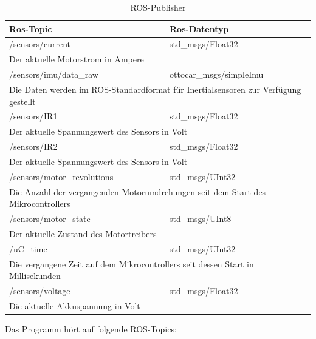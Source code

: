 \begin{table}[H]
  \centering
  \begin{tabularx}{\textwidth}{|l|l|}
    \hline
     Ros-Topic 			& Ros-Datentyp			 \\ \hline \hline	
    /sensors/current		& std\_msgs/Float32														\\ \hline
    \multicolumn{2}{|X|}{Der aktuelle Motorstrom in Ampere}											\\ \hline\hline
    /sensors/imu/data\_raw	& ottocar\_msgs/simpleImu													\\ \hline
    \multicolumn{2}{|X|}{Die Daten werden im ROS-Standardformat für Inertialsensoren zur Verfügung gestellt	}						\\ \hline\hline
    /sensors/IR1		& std\_msgs/Float32										\\ \hline
     \multicolumn{2}{|X|}{Der aktuelle Spannungswert des Sensors in Volt}										\\ \hline\hline
    /sensors/IR2		& std\_msgs/Float32										\\ \hline
      \multicolumn{2}{|X|}{Der aktuelle Spannungswert des Sensors in Volt}										\\ \hline\hline
    /sensors/motor\_revolutions	& std\_msgs/UInt32										\\ \hline
      \multicolumn{2}{|X|}{Die Anzahl der vergangenden Motorumdrehungen seit dem Start des Mikrocontrollers}						\\ \hline\hline
    /sensors/motor\_state	& std\_msgs/UInt8										\\ \hline
      \multicolumn{2}{|X|}{Der aktuelle Zustand des Motortreibers}											\\ \hline\hline
    /uC\_time			& std\_msgs/UInt32										\\ \hline
      \multicolumn{2}{|X|}{Die vergangene Zeit auf dem Mikrocontrollers seit dessen Start in Millisekunden}						\\ \hline\hline
    /sensors/voltage		& std\_msgs/Float32										\\ \hline
     \multicolumn{2}{|X|}{Die aktuelle Akkuspannung in Volt}												\\ \hline

  \end{tabularx}
  \caption{ROS-Publisher}%
  \label{tab:ros-pub}
\end{table}


Das Programm hört auf folgende ROS-Topics:\\

